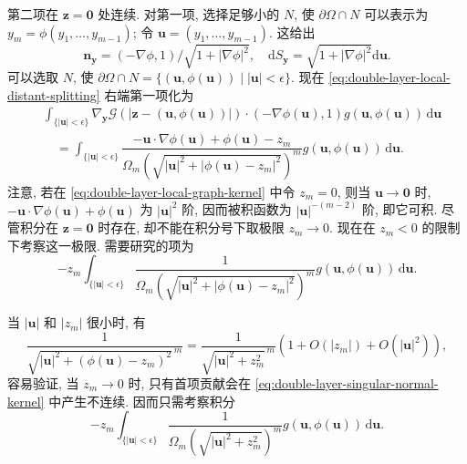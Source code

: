 第二项在 $\bm{z}=\bm{0}$ 处连续. 对第一项, 选择足够小的 $N$, 使 $\partial\Omega\cap N$ 可以表示为 $y_m=\phi(y_1,\ldots,y_{m-1})$; 令 $\bm{u}=(y_1,\ldots,y_{m-1})$. 这给出
\begin{equation}\label{eq:boundary-graph-normal-surface-measure}
\bm{n}_{\bm{y}}=(-\nabla\phi,1)/\sqrt{1+|\nabla\phi|^2},\quad\mathrm{d}S_{\bm{y}}=\sqrt{1+|\nabla\phi|^2}\mathrm{d}\bm{u}.
\end{equation}
可以选取 $N$, 使 $\partial\Omega\cap N=\{(\bm{u},\phi(\bm{u}))\mid|\bm{u}|<\epsilon\}$. 现在 \eqref{eq:double-layer-local-distant-splitting} 右端第一项化为
\begin{equation}\label{eq:double-layer-local-graph-kernel}
\begin{aligned}
&\int_{\{|\bm{u}|<\epsilon\}}\nabla_{\bm{y}}\mathcal{G}(|\bm{z}-(\bm{u},\phi(\bm{u}))|)\cdot(-\nabla\phi(\bm{u}),1)g(\bm{u},\phi(\bm{u}))\,\mathrm{d}\bm{u}\\
&\quad=\int_{\{|\bm{u}|<\epsilon\}}\dfrac{-\bm{u}\cdot\nabla\phi(\bm{u})+\phi(\bm{u})-z_m}
{\Omega_m(\sqrt{|\bm{u}|^2+|\phi(\bm{u})-z_m|^2})^m}g(\bm{u},\phi(\bm{u}))\,\mathrm{d}\bm{u}.
\end{aligned}
\end{equation}
注意, 若在 \eqref{eq:double-layer-local-graph-kernel} 中令 $z_m=0$, 则当 $\bm{u}\to\bm{0}$ 时, $-\bm{u}\cdot\nabla\phi(\bm{u})+\phi(\bm{u})$ 为 $|\bm{u}|^2$ 阶, 因而被积函数为 $|\bm{u}|^{-(m-2)}$ 阶, 即它可积. 尽管积分在 $\bm{z}=\bm{0}$ 时存在, 却不能在积分号下取极限 $z_m\to0$. 现在在 $z_m<0$ 的限制下考察这一极限. 需要研究的项为
\begin{equation}\label{eq:double-layer-singular-normal-kernel}
-z_m\int_{\{|\bm{u}|<\epsilon\}}\dfrac1{\Omega_m(\sqrt{|\bm{u}|^2+|\phi(\bm{u})-z_m|^2})^m}g(\bm{u},\phi(\bm{u}))\,\mathrm{d}\bm{u}.
\end{equation}


当 $|\bm{u}|$ 和 $|z_m|$ 很小时, 有
\begin{equation}\label{eq:double-layer-graph-denominator-expansion}
\dfrac1{\sqrt{|\bm{u}|^2+(\phi(\bm{u})-z_m)^2}^{\,m}}=\dfrac1{\sqrt{|\bm{u}|^2+z_m^2}^{\,m}}(1+O(|z_m|)+O(|\bm{u}|^2)),
\end{equation}
容易验证, 当 $z_m\to0$ 时, 只有首项贡献会在 \eqref{eq:double-layer-singular-normal-kernel} 中产生不连续. 因而只需考察积分
\begin{equation}\label{eq:double-layer-leading-normal-kernel}
-z_m\int_{\{|\bm{u}|<\epsilon\}}\dfrac1{\Omega_m(\sqrt{|\bm{u}|^2+z_m^2})^m}g(\bm{u},\phi(\bm{u}))\,\mathrm{d}\bm{u}.
\end{equation}


